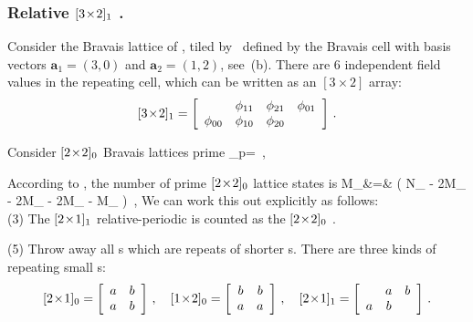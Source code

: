 \subsubsection{Relative ${[3\!\times\!2]_{1}}$ \twot.}
\label{s:catLattRel3x2_1}
Consider the Bravais lattice of , tiled by \twot\
defined by the Bravais cell with basis vectors $\mathbf{a}_1=(3,0)$ and
$\mathbf{a}_2=(1,2)$, see \reffig{fig:2x1rpo}\,(b). There are 6 independent
field values in the repeating cell, which can be written as an
$[3\!\times\!2]$ array:
\[
{[3\!\times\!2]_{1}} =
 \left[
 \begin{array}{cccc}
           & \phi_{11} & \phi_{21} & \phi_{01} \\
 \phi_{00} & \phi_{10} & \phi_{20} &
 \end{array}
 \right]
\,.
\]


Consider ${[2\!\times\!2]_{0}}$ Bravais
lattices prime {\brick}
\beq
\Mm_p=
\,,


According to , the number of prime %
$\BravCell{2}{2}{0}$ lattice states is
\bea
M_{}&=&
  \left( N_{\BravCell{2}{2}{0}}
            - 2M_{}
            - 2M_{}
            - 2M_{}
            - M_{}
  \right)
\,,
\label{catlattM2x2}
\eea
We can work this out explicitly as follows:\\

(3) The ${[2\!\times\!1]_{1}}$ relative-periodic {\brick}  is
counted as the ${[2\!\times\!2]_{0}}$ \twot.

(5) Throw away all {\brick}s which are repeats of
shorter {\brick}s. There are three kinds of repeating small {\brick}s:
\[
{[2\!\times\!1]_{0}}=\left[\begin{array}{cc}
a & b \\
a & b \\
              \end{array}\right]
\, , \quad
{\ensuremath{[1\!\times\!2]_{0}}}=\left[\begin{array}{cc}
b & b \\
a & a \\
              \end{array}\right]
\, , \quad
{\ensuremath{[2\!\times\!1]_{1}}}=\left[\begin{array}{ccc}
  & a & b \\
a & b &   \\
              \end{array}\right]
\,.
\]


